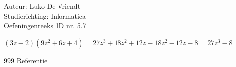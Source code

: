 \documentclass[a4paper]{article}
\begin{document}
\noindent \large Auteur: Luko De Vriendt\\
\noindent \large Studierichting: Informatica\\
\noindent \large Oefeningenreeks 1D nr. 5.7\\

\medskip

\normalsize

$ (3z-2)(9z^2+6z+4) = 27z^3 + 18z^2 + 12z -18z^2 -12z -8 = 27z^3 -8 $ \\

	
\begin{thebibliography}{999}
 Referentie
\end{thebibliography}
\end{document}
